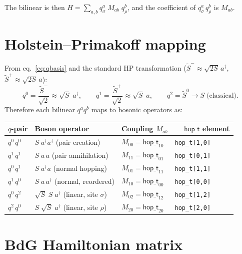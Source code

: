 \documentclass[11pt]{article}
\newcommand{\hop}{\mathsf{hop\_t}}
\newcommand{\dg}{^\dagger}
\begin{document}
The bilinear is then $H = \sum_{a,b} q^a_\sigma\; M_{ab}\; q^b_\rho$,
and the coefficient of $q^a_\sigma\,q^b_\rho$ is $M_{ab}$.


\section{Holstein--Primakoff mapping}

From eq.~\eqref{eq:qbasis} and the standard HP transformation
($\tilde{S}^- \approx \sqrt{2S}\,a\dg$, $\tilde{S}^+ \approx \sqrt{2S}\,a$):
\begin{equation}
  q^0 = \frac{\tilde{S}^-}{\sqrt{2}} \approx \sqrt{S}\;a\dg,
  \qquad
  q^1 = \frac{\tilde{S}^+}{\sqrt{2}} \approx \sqrt{S}\;a,
  \qquad
  q^2 = \tilde{S}^0 \to S \;\text{(classical)}.
\end{equation}
Therefore each bilinear $q^a q^b$ maps to bosonic operators as:
\begin{center}
\begin{tabular}{llll}
\toprule
$q$-pair & Boson operator & Coupling $M_{ab}$ & $= \hop$ element \\
\midrule
$q^0\,q^0$ & $S\;a\dg a\dg$ \quad (pair creation) &
  $M_{00} = \hop_{10}$ & \texttt{hop\_t[1,0]} \\
$q^1\,q^1$ & $S\;a\,a$ \quad (pair annihilation) &
  $M_{11} = \hop_{01}$ & \texttt{hop\_t[0,1]} \\
$q^0\,q^1$ & $S\;a\dg a$ \quad (normal hopping) &
  $M_{01} = \hop_{11}$ & \texttt{hop\_t[1,1]} \\
$q^1\,q^0$ & $S\;a\,a\dg$ \quad (normal, reordered) &
  $M_{10} = \hop_{00}$ & \texttt{hop\_t[0,0]} \\[4pt]
$q^0\,q^2$ & $\sqrt{S}\;S\;a\dg$ \quad (linear, site $\sigma$) &
  $M_{02} = \hop_{12}$ & \texttt{hop\_t[1,2]} \\
$q^2\,q^0$ & $S\;\sqrt{S}\;a\dg$ \quad (linear, site $\rho$) &
  $M_{20} = \hop_{20}$ & \texttt{hop\_t[2,0]} \\
\bottomrule
\end{tabular}
\end{center}


\section{BdG Hamiltonian matrix}
\end{document}

